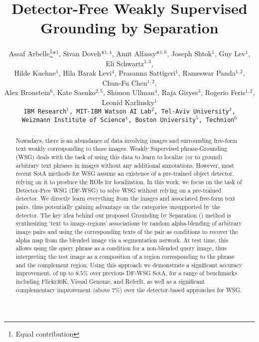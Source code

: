 \documentclass[10pt,twocolumn,letterpaper]{article}
\def\oursfull{Grounding by Separation }
\def\ourstask{DF-WSG}
\def\ourstaskfull{Detector-Free WSG }
\begin{document}
\title{
Detector-Free Weakly Supervised Grounding by Separation
}

\author{
    Assaf Arbelle\thanks{Equal contribution}\hspace{-1pt}*$^{1}$,
    Sivan Doveh*$^{1,4}$,
    Amit Alfassy*$^{1,6}$,
    Joseph Shtok$^{1}$,
    Guy Lev$^{1}$,
    Eli Schwartz$^{1,3}$,\\
    Hilde Kuehne$^{1}$,
    Hila Barak Levi$^{4}$,
    Prasanna Sattigeri$^{1}$,
    Rameswar Panda$^{1,2}$,
    Chun-Fu Chen$^{1,2}$,\\
    Alex Bronstein$^{6}$,
    Kate Saenko$^{2,5}$,
    Shimon Ullman$^{4}$,
    Raja Giryes$^{3}$,
    Rogerio Feris$^{1,2}$,
    Leonid Karlinsky$^{1}$\\
    {\tt\small IBM Research$^{1}$, MIT-IBM Watson AI Lab$^{2}$, Tel-Aviv University$^{3}$,} \\
    {\tt\small  Weizmann Institute of Science$^{4}$, Boston University$^{5}$, Technion$^{6}$}
} 
\maketitle
\ificcvfinal\thispagestyle{empty}\fi

\begin{abstract}
   Nowadays, there is an abundance of data involving images and surrounding free-form text weakly corresponding to those images. Weakly Supervised phrase-Grounding (WSG) deals with the task of using this data to learn to localize (or to ground) arbitrary text phrases in images without any additional annotations. However, most recent SotA methods for WSG assume an existence of a pre-trained object detector, relying  on it to produce the ROIs for localization.
In this work, we focus on the task of \ourstaskfull{} (\ourstask{}) to solve WSG without relying on a pre-trained detector. We directly learn everything from the images and associated free-form text pairs, thus potentially gaining advantage on the categories unsupported by the detector.
The key idea behind our proposed \oursfull{} (\ours) method is synthesizing `text to image-regions' associations by random alpha-blending of arbitrary image pairs and using the corresponding texts of the pair as conditions to recover the alpha map from the blended image via a segmentation network. At test time, this allows using the query phrase as a condition for a non-blended query image, thus interpreting the test image as a composition of a region corresponding to the phrase and the complement region. Using this approach we demonstrate a significant accuracy improvement, of up to $8.5\%$ over previous \ourstask{} SotA, for a range of benchmarks including Flickr30K, Visual Genome, and ReferIt, as well as a significant complementary improvement (above $7\%$) over the detector-based approaches for WSG. \end{abstract}
\end{document}
